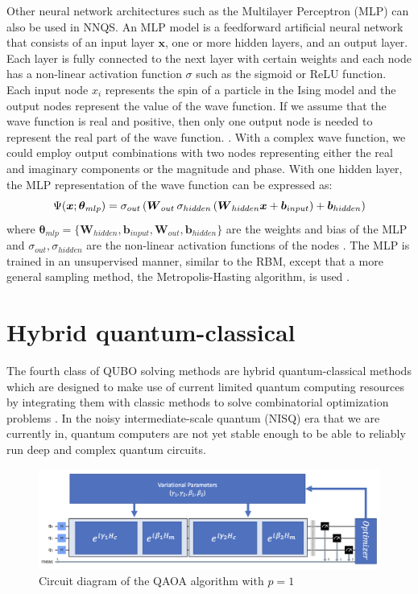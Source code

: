 Other neural network architectures such as the Multilayer Perceptron (MLP) can also be used in NNQS. An MLP model is a feedforward artificial neural network that consists of an input layer $\boldsymbol{x}$, one or more hidden layers, and an output layer. Each layer is fully connected to the next layer with certain weights and each node has a non-linear activation function $\sigma$ such as the sigmoid or ReLU function. Each input node $x_i$ represents the spin of a particle in the Ising model and the output nodes represent the value of the wave function. If we assume that the wave function is real and positive, then only one output node is needed to represent the real part of the wave function. \cite{b20}. With a complex wave function, we could employ output combinations with two nodes representing either the real and imaginary components or the magnitude and phase. With one hidden layer, the MLP representation of the wave function can be expressed as:
\begin{equation}
    \Psi(\boldsymbol{x}; \boldsymbol{\theta}_{mlp}) = 
    \sigma_{out} \left(
    \boldsymbol{W}_{out} \hspace{2px}
    \sigma_{hidden} \left( \boldsymbol{W}_{hidden}\boldsymbol{x} + \boldsymbol{b}_{input} \right) + \boldsymbol{b}_{hidden} \right)
\end{equation}
where  $\boldsymbol{\theta}_{mlp} = \{\boldsymbol{W}_{hidden}, \boldsymbol{b}_{input}, \boldsymbol{W}_{out}, \boldsymbol{b}_{hidden}\}$ are the weights and bias of the MLP and $\sigma_{out}, \sigma_{hidden}$ are the non-linear activation functions of the nodes \cite{b20}. The MLP is trained in an unsupervised manner, similar to the RBM, except that a more general sampling method, the Metropolis-Hasting algorithm, is used \cite{b25}.

\section{Hybrid quantum-classical}
The fourth class of QUBO solving methods are hybrid quantum-classical methods which are designed to make use of current limited quantum computing resources by integrating them with classic methods to solve combinatorial optimization problems \cite{b32}. In the noisy intermediate-scale quantum (NISQ) era that we are currently in, quantum computers are not yet stable enough to be able to reliably run deep and complex quantum circuits. 

\begin{figure}[h!]
    \centering
    \includegraphics[width=\linewidth]{images/qaoa_circuit.png}
    \caption{Circuit diagram of the QAOA algorithm with $p=1$}
    \label{qaoacircuit}
\end{figure}

